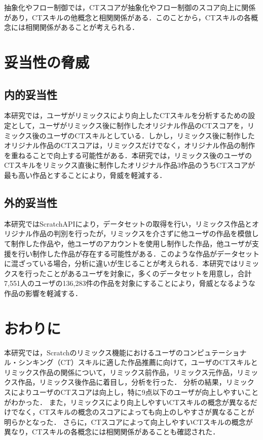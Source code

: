 \documentclass[11pt]{jreport}
\begin{document}
抽象化やフロー制御では，CTスコアが抽象化やフロー制御のスコア向上に関係があり，CTスキルの他概念と相関関係がある．このことから，CTスキルの各概念には相関関係があることが考えられる．



\chapter{妥当性の脅威}

\section{内的妥当性}
本研究では，ユーザがリミックスにより向上したCTスキルを分析するための設定として，ユーザがリミックス後に制作したオリジナル作品のCTスコアを，リミックス後のユーザのCTスキルとしている．しかし，リミックス後に制作したオリジナル作品のCTスコアは，リミックスだけでなく，オリジナル作品の制作を重ねることで向上する可能性がある．本研究では，リミックス後のユーザのCTスキルをリミックス直後に制作したオリジナル作品3作品のうちCTスコアが最も高い作品とすることにより，脅威を軽減する．

\section{外的妥当性}
本研究ではScratchAPIにより，データセットの取得を行い，リミックス作品とオリジナル作品の判別を行ったが，リミックスを介さずに他ユーザの作品を模倣して制作した作品や，他ユーザのアカウントを使用し制作した作品，他ユーザが支援を行い制作した作品が存在する可能性がある．このような作品がデータセットに混ざっている場合，分析に違いが生じることが考えられる．本研究ではリミックスを行ったことがあるユーザを対象に，多くのデータセットを用意し，合計7,551人のユーザの136,283件の作品を対象にすることにより，脅威となるような作品の影響を軽減する．

\chapter{おわりに}
本研究では，Scratchのリミックス機能におけるユーザのコンピュテーショナル・シンキング（CT）スキルに適した作品推薦に向けて，ユーザのCTスキルとリミックス作品の関係について，リミックス前作品，リミックス元作品，リミックス作品，リミックス後作品に着目し，分析を行った．
分析の結果，リミックスによりユーザのCTスコアは向上し，特に9点以下のユーザが向上しやすいことがわかった．
また，リミックスにより向上しやすいCTスキルの概念が異なるだけでなく，CTスキルの概念のスコアによっても向上のしやすさが異なることが明らかとなった．
さらに，CTスコアによって向上しやすいCTスキルの概念が異なり，CTスキルの各概念には相関関係があることも確認された．
\end{document}
